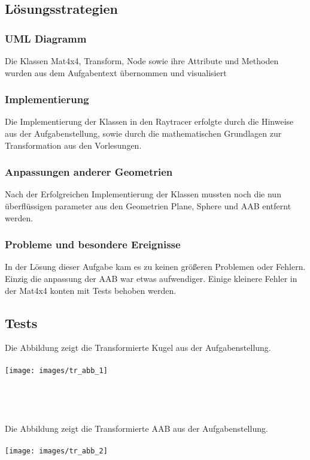 \documentclass[14pt]{extarticle}
\begin{document}
\subsection{Lösungsstrategien}
\subsubsection{UML Diagramm}
Die Klassen Mat4x4, Transform, Node sowie ihre Attribute und Methoden wurden aus dem Aufgabentext übernommen und visualisiert
\subsubsection{Implementierung}
Die Implementierung der Klassen in den Raytracer erfolgte durch die Hinweise aus der Aufgabenstellung, sowie durch die mathematischen Grundlagen zur Transformation aus den Vorlesungen.

\subsubsection{Anpassungen anderer Geometrien}
Nach der Erfolgreichen Implementierung der Klassen mussten noch die nun überflüssigen parameter aus den Geometrien Plane, Sphere und AAB entfernt werden.
\subsubsection{Probleme und besondere Ereignisse}
In der Lösung dieser Aufgabe kam es zu keinen größeren Problemen oder Fehlern. Einzig die anpassung der AAB war etwas aufwendiger. Einige kleinere Fehler in der Mat4x4 konten mit Tests behoben werden.

\subsection{Tests}
Die Abbildung zeigt die Transformierte Kugel aus der Aufgabenstellung.\\\\
\texttt{[image: images/tr\_abb\_1]}\\\\\\\\\\
Die Abbildung zeigt die Transformierte AAB aus der Aufgabenstellung.\\\\
\texttt{[image: images/tr\_abb\_2]}\\
\end{document}
